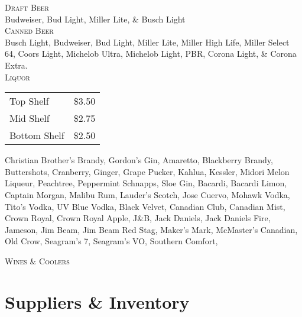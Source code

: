 \documentclass[a0,landscape]{a0poster}
\begin{document}
\begin{multicols}{4}
\vspace{1cm}

\noindent \textsc{Draft Beer} \\
Budweiser, Bud Light, Miller Lite, \& Busch Light \\

\noindent \textsc {Canned Beer} \\
Busch Light, Budweiser, Bud Light, Miller Lite, Miller High Life, Miller Select 64, Coors Light, Michelob Ultra, Michelob Light, PBR, Corona Light, \& Corona Extra. \\

\noindent \textsc{Liquor} \\

\begin{center}
\begin{tabular}{ l r }
Top Shelf & \$3.50 \\
Mid Shelf & \$2.75 \\
Bottom Shelf & \$2.50 \\
\end{tabular}
\end{center}

Christian Brother's Brandy, Gordon's Gin, Amaretto, Blackberry Brandy, Buttershots, Cranberry, Ginger, Grape Pucker, Kahlua, Kessler, Midori Melon Liqueur, Peachtree, Peppermint Schnapps, Sloe Gin, Bacardi, Bacardi Limon, Captain Morgan, Malibu Rum, Lauder's Scotch, Jose Cuervo, Mohawk Vodka, Tito's Vodka, UV Blue Vodka, Black Velvet, Canadian Club, Canadian Mist, Crown Royal, Crown Royal Apple, J\&B, Jack Daniels, Jack Daniels Fire, Jameson, Jim Beam, Jim Beam Red Stag, Maker's Mark, McMaster's Canadian, Old Crow, Seagram's 7, Seagram’s VO, Southern Comfort,

\vspace{1cm}

\textsc{Wines \& Coolers}



\color{DarkGreen}
\section*{Suppliers \& Inventory}


\end{multicols}
\end{document}
